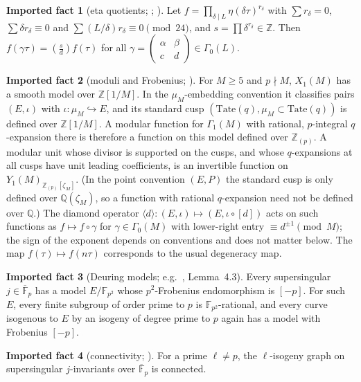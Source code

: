 \documentclass[11pt,a4paper]{article}
\numberwithin{equation}{section}
\theoremstyle{definition}
\newtheorem{fact}{Imported fact}
\theoremstyle{remark}
\newcommand{\Fq}{\mathbb F_{p^2}}
\newcommand{\Fb}{\overline{\mathbb F}_p}
\newcommand{\Z}{\mathbb Z}
\newcommand{\Q}{\mathbb Q}
\newcommand{\leg}[2]{\left(\frac{#1}{#2}\right)}
\begin{document}
\begin{fact}[{eta quotients; \citealp{GH93,Newman59}; \citealp[Thm.~1.64]{Ono04}}]\label{fact:ghn}
Let $f=\prod_{\delta\mid L}\eta(\delta\tau)^{r_\delta}$ with $\sum r_\delta=0$, $\sum\delta r_\delta\equiv0$ and
$\sum(L/\delta)r_\delta\equiv0\pmod{24}$, and $s=\prod\delta^{r_\delta}\in\Z$. Then
$f(\gamma\tau)=\leg{s}{d}f(\tau)$ for all $\gamma=\begin{pmatrix}\alpha&\beta\\ c&d\end{pmatrix}\in\Gamma_0(L)$.
\end{fact}

\begin{fact}[moduli and Frobenius; \citealp{DR73,KM85,DI95}]\label{fact:moduli}
For $M\ge5$ and $p\nmid M$, $X_1(M)$ has a smooth model over $\Z[1/M]$. In the $\mu_M$-embedding
convention it classifies pairs $(E,\iota)$ with $\iota:\mu_M\hookrightarrow E$, and its standard cusp
$(\mathrm{Tate}(q),\mu_M\subset\mathrm{Tate}(q))$ is defined over $\Z[1/M]$. A modular function for $\Gamma_1(M)$
with rational, $p$-integral $q$-expansion there is therefore a function on this model defined over $\Z_{(p)}$.
A modular unit whose divisor is supported on the cusps, and whose $q$-expansions at all cusps have unit leading
coefficients, is an invertible function on $Y_1(M)_{\Z_{(p)}[\zeta_M]}$. (In the point convention $(E,P)$ the standard
cusp is only defined over $\Q(\zeta_M)$, so a function with rational $q$-expansion need not be defined over $\Q$.)
The diamond operator $\langle d\rangle:(E,\iota)\mapsto(E,\iota\circ[d])$ acts on such functions as
$f\mapsto f\circ\gamma$ for $\gamma\in\Gamma_0(M)$ with lower-right entry $\equiv d^{\pm1}\pmod M$; the sign of the
exponent depends on conventions and does not matter below. The map $f(\tau)\mapsto f(n\tau)$ corresponds to the usual degeneracy map.
\end{fact}

\begin{fact}[Deuring models; e.g.\ \citealp{Ono25}, Lemma~4.3]\label{fact:deuring}
Every supersingular $j\in\Fb$ has a model $E/\Fq$ whose $p^2$-Frobenius endomorphism is $[-p]$. For
such $E$, every finite subgroup of order prime to $p$ is $\Fq$-rational, and every curve isogenous to $E$ by an isogeny of degree prime to $p$ again has a model with Frobenius $[-p]$.
\end{fact}

\begin{fact}[connectivity; \citealp{Mestre86,Pizer90}]\label{fact:graph}
For a prime $\ell\ne p$, the $\ell$-isogeny graph on supersingular $j$-invariants over $\Fb$ is connected.
\end{fact}
\end{document}
